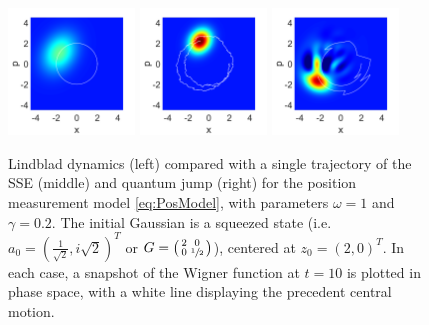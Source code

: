 \documentclass[12pt]{iopart} %
\begin{document}
\begin{figure}
\begin{centering}
	  \includegraphics[width=0.3\textwidth]{WigLindEndPos.pdf}
	  \includegraphics[width=0.3\textwidth]{WigSemiEndPos.pdf}
	  \includegraphics[width=0.3\textwidth]{WigJumpEndPos.pdf}
\caption{Lindblad dynamics (left) compared with a single trajectory of the SSE (middle) and quantum jump (right) for the position measurement model \cref{eq:PosModel}, with parameters $\omega=1$ and $\gamma=0.2$. The initial Gaussian is a squeezed state (i.e. $a_0=(\tfrac{1}{\sqrt{2}}, i\sqrt{2})^T$ or $G=\left(\begin{smallmatrix}2&0\\0&\sfrac{1}{2}\end{smallmatrix}\right)$), centered at $z_0=\left(2,0\right)^T$. In each case, a snapshot of the Wigner function at $t=10$ is plotted in phase space, with a white line displaying the precedent central motion.} \label{fig:WigPlotsPos}
\end{centering}
\end{figure}
\end{document}
